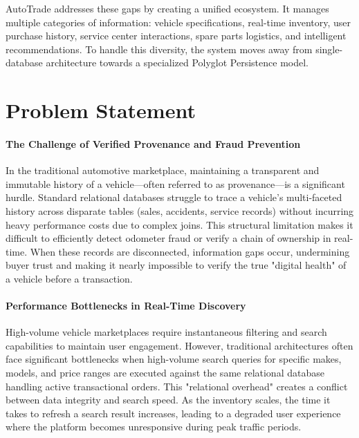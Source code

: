 \documentclass[12pt,a4paper]{report}
\begin{document}
AutoTrade addresses these gaps by creating a unified ecosystem. It manages multiple categories of information: vehicle specifications, real-time inventory, user purchase history, service center interactions, spare parts logistics, and intelligent recommendations. To handle this diversity, the system moves away from single-database architecture towards a specialized Polyglot Persistence model.

\section{Problem Statement}

\paragraph{The Challenge of Verified Provenance and Fraud Prevention} 
In the traditional automotive marketplace, maintaining a transparent and immutable history of a vehicle—often referred to as provenance—is a significant hurdle. Standard relational databases struggle to trace a vehicle's multi-faceted history across disparate tables (sales, accidents, service records) without incurring heavy performance costs due to complex joins. This structural limitation makes it difficult to efficiently detect odometer fraud or verify a chain of ownership in real-time. When these records are disconnected, information gaps occur, undermining buyer trust and making it nearly impossible to verify the true "digital health" of a vehicle before a transaction.

\vspace{1em} 

\paragraph{Performance Bottlenecks in Real-Time Discovery} 
High-volume vehicle marketplaces require instantaneous filtering and search capabilities to maintain user engagement. However, traditional architectures often face significant bottlenecks when high-volume search queries for specific makes, models, and price ranges are executed against the same relational database handling active transactional orders. This "relational overhead" creates a conflict between data integrity and search speed. As the inventory scales, the time it takes to refresh a search result increases, leading to a degraded user experience where the platform becomes unresponsive during peak traffic periods.
\end{document}
